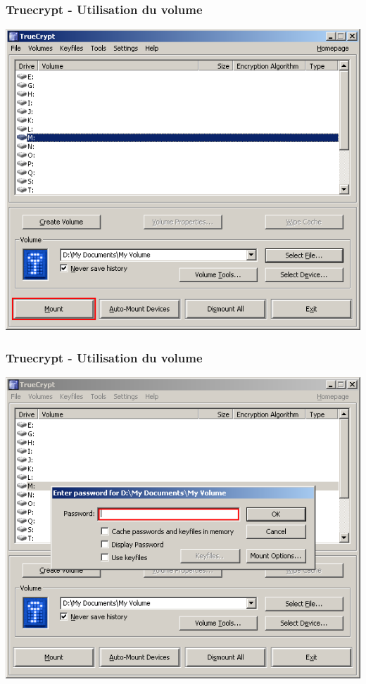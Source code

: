 \documentclass{beamer}
\begin{document}
\begin{frame}
\frametitle{Truecrypt - Utilisation du volume}
\begin{center}
\includegraphics[scale=0.5] {./images/Truecrypt16.png} 
\end{center}
\end{frame}
\begin{frame}
\frametitle{Truecrypt - Utilisation du volume}
\begin{center}
\includegraphics[scale=0.5] {./images/Truecrypt17.png} 
\end{center}
\end{frame}
\end{document}

